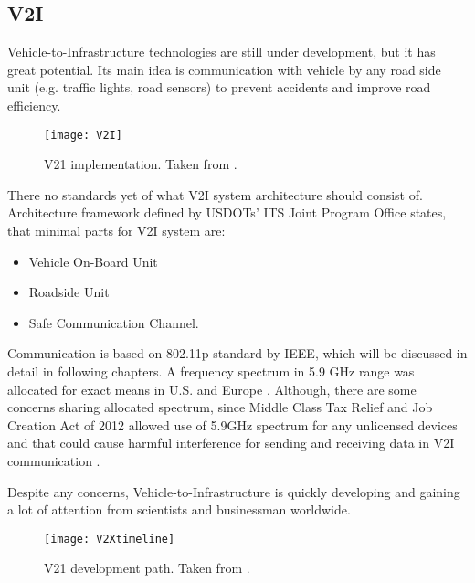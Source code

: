 \subsection{V2I}
% 
Vehicle-to-Infrastructure technologies are still under development, but it has great potential. Its main idea is communication with vehicle by any road side unit (e.g. traffic lights, road sensors) to prevent accidents and improve road efficiency.\par
% 
\begin{figure}[h]
\texttt{[image: V2I]}
\caption{V21 implementation. Taken from \cite{U.S.GovernmentAccountabilityOffice2015IntelligentExist}.}
\label{fig:V2Iimplementation}
\centering
\end{figure}
% 
There no standards yet of what V2I system architecture should consist of. Architecture framework defined by USDOTs' ITS Joint Program Office \cite{Dr.Gaspar2014HighlySystems} states, that minimal parts for V2I system are:
\begin{itemize}[noitemsep,nolistsep]
    \item Vehicle On-Board Unit
    \item Roadside Unit
    \item Safe Communication Channel.
\end{itemize}
% 
Communication is based on 802.11p standard by IEEE, which will be discussed in detail in following chapters. A frequency spectrum in 5.9 GHz range was allocated for exact means in U.S. and Europe \cite{2011TheTechnology}. Although, there are some concerns sharing allocated spectrum, since Middle Class Tax Relief and Job Creation Act of 2012 allowed use of 5.9GHz spectrum for any unlicensed devices and that could cause harmful interference for sending and receiving data in V2I communication \cite{U.S.GovernmentAccountabilityOffice2015IntelligentExist}.\par
% 
Despite any concerns, Vehicle-to-Infrastructure is quickly developing and gaining a lot of attention from scientists and businessman worldwide.\par
%
\begin{figure}[h]
\texttt{[image: V2Xtimeline]}
\caption{V21 development path. Taken from \cite{U.S.GovernmentAccountabilityOffice2015IntelligentExist}.}
\label{fig:V2Idevelopment}
\centering
\end{figure}

